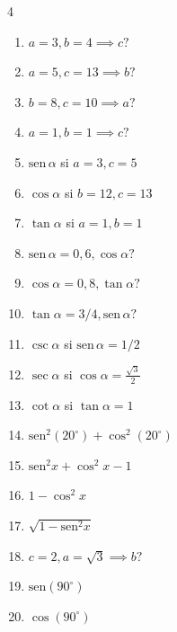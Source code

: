 \documentclass[letterpaper, 12pt]{article}
\begin{document}
\begin{multicols}{4}
\small
\begin{enumerate}[label=\textbf{\arabic*.}, noitemsep, leftmargin=*]
    \item $a=3, b=4 \implies c?$
    \item $a=5, c=13 \implies b?$
    \item $b=8, c=10 \implies a?$
    \item $a=1, b=1 \implies c?$
    \item $\text{sen}\,\alpha$ si $a=3, c=5$
    \item $\cos \alpha$ si $b=12, c=13$
    \item $\tan \alpha$ si $a=1, b=1$
    \item $\text{sen}\,\alpha = 0,6, \cos \alpha?$
    \item $\cos \alpha = 0,8, \tan \alpha?$
    \item $\tan \alpha = 3/4, \text{sen}\,\alpha?$
    \item $\csc \alpha$ si $\text{sen}\,\alpha = 1/2$
    \item $\sec \alpha$ si $\cos \alpha = \frac{\sqrt{3}}{2}$
    \item $\cot \alpha$ si $\tan \alpha = 1$
    \item $\text{sen}^2(20^\circ) + \cos^2(20^\circ)$
    \item $\text{sen}^2 x + \cos^2 x - 1$
    \item $1 - \cos^2 x$
    \item $\sqrt{1 - \text{sen}^2 x}$
    \item $c=2, a=\sqrt{3} \implies b?$
    \item $\text{sen}(90^\circ)$
    \item $\cos(90^\circ)$
\end{enumerate}
\end{multicols}
\end{document}
